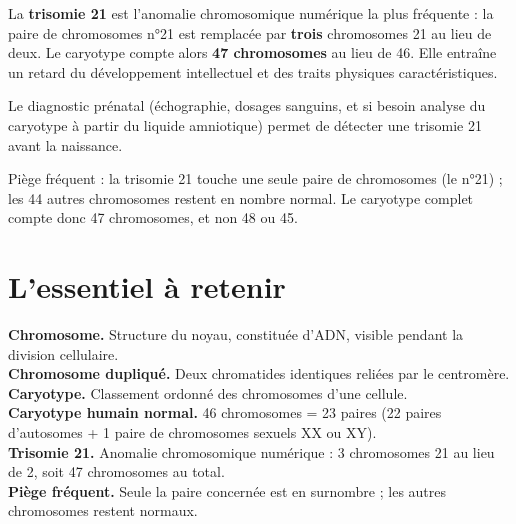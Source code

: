 \begin{propriete}[La trisomie 21]
La \textbf{trisomie 21} est l'anomalie chromosomique numérique la plus fréquente : la
paire de chromosomes n°21 est remplacée par \textbf{trois} chromosomes 21 au lieu de
deux. Le caryotype compte alors \textbf{47 chromosomes} au lieu de 46. Elle entraîne un
retard du développement intellectuel et des traits physiques caractéristiques.
\end{propriete}

\begin{illus}
\end{illus}

\begin{exemple}
Le diagnostic prénatal (échographie, dosages sanguins, et si besoin analyse du
caryotype à partir du liquide amniotique) permet de détecter une trisomie 21 avant la
naissance.
\end{exemple}

\begin{remarque}
Piège fréquent : la trisomie 21 touche une seule paire de chromosomes (le n°21) ; les
44 autres chromosomes restent en nombre normal. Le caryotype complet compte donc 47
chromosomes, et non 48 ou 45.
\end{remarque}

\section{L'essentiel à retenir}

\begin{synthese}
\textbf{Chromosome.} Structure du noyau, constituée d'ADN, visible pendant la division
cellulaire.\\[4pt]
\textbf{Chromosome dupliqué.} Deux chromatides identiques reliées par le
centromère.\\[4pt]
\textbf{Caryotype.} Classement ordonné des chromosomes d'une cellule.\\[4pt]
\textbf{Caryotype humain normal.} 46 chromosomes = 23 paires (22 paires d'autosomes +
1 paire de chromosomes sexuels XX ou XY).\\[4pt]
\textbf{Trisomie 21.} Anomalie chromosomique numérique : 3 chromosomes 21 au lieu de 2,
soit 47 chromosomes au total.\\[4pt]
\textbf{Piège fréquent.} Seule la paire concernée est en surnombre ; les autres
chromosomes restent normaux.
\end{synthese}

